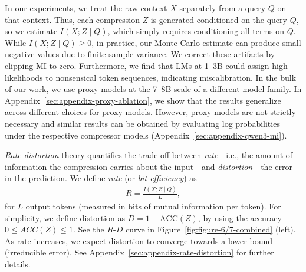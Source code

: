 \documentclass{article} %
\begin{document}
In our experiments, we treat the raw context $X$ separately from a query $Q$ on that context. Thus, each compression $Z$ is generated conditioned on the query $Q$, so we estimate \(I(X;Z \mid Q)\), which simply requires conditioning all terms on $Q$. While \(I(X;Z \mid Q) \geq 0\), in practice, our Monte Carlo estimate can produce small negative values due to finite-sample variance. We correct these artifacts by clipping MI to zero. 
Furthermore, we find that LMs at 1--3B could assign high likelihoods to nonsensical token sequences, indicating miscalibration. 
In the bulk of our work, we use proxy models at the 7--8B scale of a different model family.
In Appendix~\ref{sec:appendix-proxy-ablation}, we show that the results generalize across different choices for proxy models. 
However, proxy models are not strictly necessary and similar results can be obtained by evaluating log probabilities under the respective compressor models (Appendix~\ref{sec:appendix-qwen3-mi}).

\emph{Rate-distortion} theory quantifies the trade-off between \emph{rate}---i.e., the amount of information the compression carries about the input---and \emph{distortion}---the error in the prediction.
We define \emph{rate} (or \emph{bit-efficiency}) as 
\begin{align*}
    R = \frac{I(X;Z \mid Q)}{L},
\end{align*}
for $L$ output tokens (measured in bits of mutual information per token). For simplicity, we define distortion as $D = 1 - \text{ACC}(Z)$, by using the accuracy $0\leq ACC(Z) \leq 1$. See the $R$-$D$ curve in Figure~\ref{fig:figure-6/7-combined} (left). As rate increases, we expect distortion to converge towards a lower bound (irreducible error).
See Appendix~\ref{sec:appendix-rate-distortion} for further details.
\end{document}
